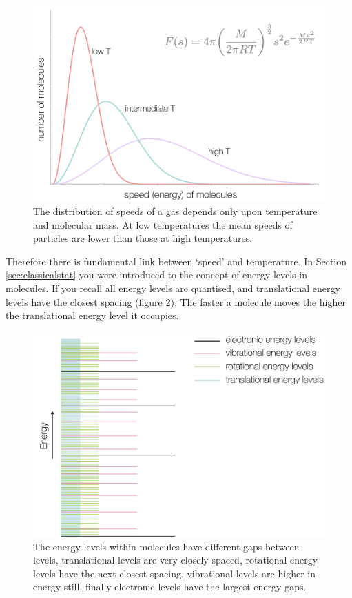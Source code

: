 \documentclass[
]{book}
\begin{document}
\begin{figure}

{\centering \includegraphics[width=0.8\linewidth]{images/boltzmann} 

}

\caption{The distribution of speeds of a gas depends only upon temperature and molecular mass. At low temperatures the mean speeds of particles are lower than those at high temperatures.}\label{fig:boltzmann}
\end{figure}

Therefore there is fundamental link between `speed' and temperature. In Section \ref{sec:classicalstat} you were introduced to the concept of energy levels in molecules. If you recall all energy levels are quantised, and translational energy levels have the closest spacing (figure \ref{fig:energylevels}). The faster a molecule moves the higher the translational energy level it occupies.

\begin{figure}

{\centering \includegraphics[width=0.8\linewidth]{images/energylevels} 

}

\caption{The energy levels within molecules have different gaps between levels, translational levels are very closely spaced, rotational energy levels have the next closest spacing, vibrational levels are higher in energy still, finally electronic levels have the largest energy gaps.}\label{fig:energylevels}
\end{figure}
\end{document}
